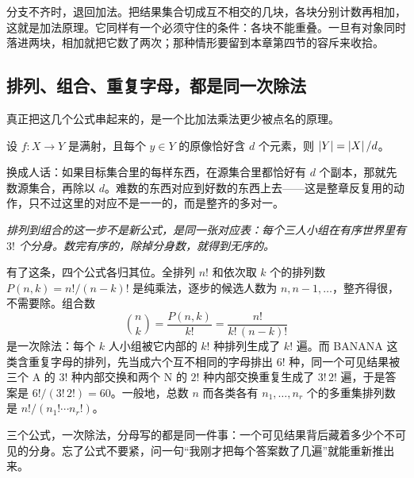 分支不齐时，退回加法。把结果集合切成互不相交的几块，各块分别计数再相加，这就是加法原理。它同样有一个必须守住的条件：各块不能重叠。一旦有对象同时落进两块，相加就把它数了两次；那种情形要留到本章第四节的容斥来收拾。

\subsection{排列、组合、重复字母，都是同一次除法}

真正把这几个公式串起来的，是一个比加法乘法更少被点名的原理。

\begin{proposition}[除法原理]
设 \(f:X\to Y\) 是满射，且每个 \(y\in Y\) 的原像恰好含 \(d\) 个元素，则 \(\left|Y\right|=\left|X\right|/d\)。
\end{proposition}

换成人话：如果目标集合里的每样东西，在源集合里都恰好有 \(d\) 个副本，那就先数源集合，再除以 \(d\)。难数的东西对应到好数的东西上去——这是整章反复用的动作，只不过这里的对应不是一一的，而是整齐的多对一。

\begin{center}

\emph{排列到组合的这一步不是新公式，是同一张对应表：每个三人小组在有序世界里有 \(3!\) 个分身。数完有序的，除掉分身数，就得到无序的。}
\end{center}

有了这条，四个公式各归其位。全排列 \(n!\) 和依次取 \(k\) 个的排列数 \(P(n,k)=n!/(n-k)!\) 是纯乘法，逐步的候选人数为 \(n,n-1,\dots\)，整齐得很，不需要除。组合数
\[
\binom nk=\frac{P(n,k)}{k!}=\frac{n!}{k!\,(n-k)!}
\]
是一次除法：每个 \(k\) 人小组被它内部的 \(k!\) 种排列生成了 \(k!\) 遍。而 BANANA 这类含重复字母的排列，先当成六个互不相同的字母排出 \(6!\) 种，同一个可见结果被三个 A 的 \(3!\) 种内部交换和两个 N 的 \(2!\) 种内部交换重复生成了 \(3!\,2!\) 遍，于是答案是 \(6!/(3!\,2!)=60\)。一般地，总数 \(n\) 而各类各有 \(n_1,\dots,n_r\) 个的多重集排列数是 \(n!/(n_1!\cdots n_r!)\)。

三个公式，一次除法，分母写的都是同一件事：一个可见结果背后藏着多少个不可见的分身。忘了公式不要紧，问一句``我刚才把每个答案数了几遍''就能重新推出来。

